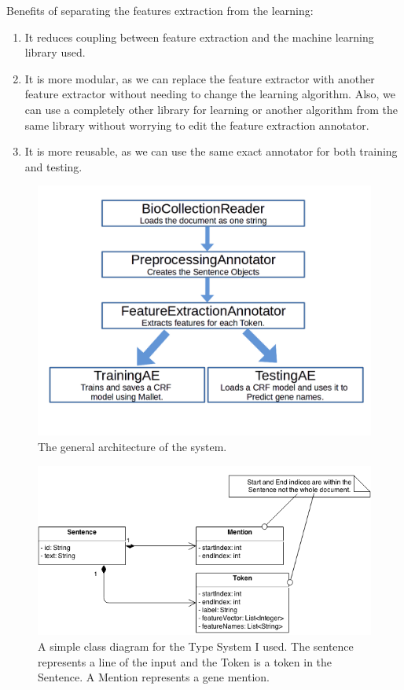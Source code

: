 \documentclass{article}
\begin{document}
Benefits of separating the features extraction from the learning:
\begin{enumerate}
\item It reduces coupling between feature extraction and the machine learning library used.
\item It is more modular, as we can replace the feature extractor with another feature extractor without needing to change the learning algorithm. Also, we can use a completely other library for learning or another algorithm from the same library without worrying to edit the feature extraction annotator.
\item It is more reusable, as we can use the same exact annotator for both training and testing.
\end{enumerate}
\begin{figure}[h!]
\label{fram} 
\centering
\includegraphics[width=14cm]{framework.png}
  \caption{The general architecture of the system.}
\end{figure}

\begin{figure}[h!]
  \centering
\includegraphics[width=14cm]{HW1-genes-UML.png}

  \caption{A simple class diagram for the Type System I used. The sentence represents a line of the input and the Token is a token in the Sentence. A Mention represents a gene mention.}
\end{figure}
\end{document}
